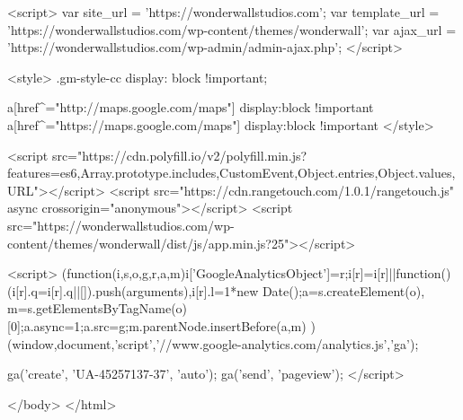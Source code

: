 <script>
	var site_url = 'https://wonderwallstudios.com';
	var template_url = 'https://wonderwallstudios.com/wp-content/themes/wonderwall';
	var ajax_url = 'https://wonderwallstudios.com/wp-admin/admin-ajax.php';
</script>

<style>
  .gm-style-cc {
    display: block !important;
  }

  a[href^="http://maps.google.com/maps"]{ display:block !important }
  a[href^="https://maps.google.com/maps"]{ display:block !important }
</style>

<script src="https://cdn.polyfill.io/v2/polyfill.min.js?features=es6,Array.prototype.includes,CustomEvent,Object.entries,Object.values,URL"></script>
<script src="https://cdn.rangetouch.com/1.0.1/rangetouch.js" async crossorigin="anonymous"></script>
<script src="https://wonderwallstudios.com/wp-content/themes/wonderwall/dist/js/app.min.js?25"></script>


    <script>
    (function(i,s,o,g,r,a,m){i['GoogleAnalyticsObject']=r;i[r]=i[r]||function(){
    (i[r].q=i[r].q||[]).push(arguments)},i[r].l=1*new Date();a=s.createElement(o),
    m=s.getElementsByTagName(o)[0];a.async=1;a.src=g;m.parentNode.insertBefore(a,m)
    })(window,document,'script','//www.google-analytics.com/analytics.js','ga');

    ga('create', 'UA-45257137-37', 'auto');
    ga('send', 'pageview');
  </script>
  
</body>
</html>
